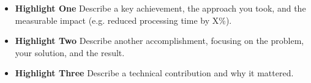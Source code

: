 \begin{itemize}
  \item \textbf{Highlight One} Describe a key achievement, the approach you took, and the measurable impact (e.g. reduced processing time by X\%).
  \item \textbf{Highlight Two} Describe another accomplishment, focusing on the problem, your solution, and the result.
  \item \textbf{Highlight Three} Describe a technical contribution and why it mattered.
\end{itemize}
